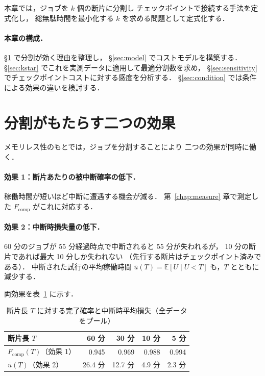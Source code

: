 \documentclass[11pt,a4paper]{ltjsreport}
\newcommand{\Fcomp}{F_{\mathrm{comp}}}
\newcommand{\E}{\mathbb{E}}
\begin{document}
本章では，ジョブを $k$ 個の断片に分割し
チェックポイントで接続する手法を定式化し，
総無駄時間を最小化する $k$ を求める問題として定式化する．

\paragraph{本章の構成．}
\S\ref{sec:two_effects} で分割が効く理由を整理し，
\S\ref{sec:model} でコストモデルを構築する．
\S\ref{sec:kstar} でこれを実測データに適用して最適分割数を求め，
\S\ref{sec:sensitivity} でチェックポイントコストに対する感度を分析する．
\S\ref{sec:condition} では条件による効果の違いを検討する．

\section{分割がもたらす二つの効果}
\label{sec:two_effects}

メモリレス性のもとでは，ジョブを分割することにより
二つの効果が同時に働く．

\paragraph{効果 1：断片あたりの被中断確率の低下．}
稼働時間が短いほど中断に遭遇する機会が減る．
第~\ref{chap:measure} 章で測定した $\Fcomp$ がこれに対応する．

\paragraph{効果 2：中断時損失量の低下．}
60 分のジョブが 55 分経過時点で中断されると 55 分が失われるが，
10 分の断片であれば最大 10 分しか失われない
（先行する断片はチェックポイント済みである）．
中断された試行の平均稼働時間
$\bar u(T) = \E[U \mid U < T]$ も，$T$ とともに減少する．

両効果を表~\ref{tab:split_effect} に示す．

\begin{table}[htbp]
\centering
\caption{断片長 $T$ に対する完了確率と中断時平均損失（全データをプール）}
\label{tab:split_effect}
\small
\begin{tabular}{@{}lrrrr@{}}
\toprule
断片長 $T$ & 60 分 & 30 分 & 10 分 & 5 分 \\
\midrule
$\Fcomp(T)$（効果 1） & 0.945 & 0.969 & 0.988 & 0.994 \\
$\bar u(T)$（効果 2） & 26.4 分 & 12.7 分 & 4.9 分 & 2.3 分 \\
\bottomrule
\end{tabular}
\end{table}
\end{document}
